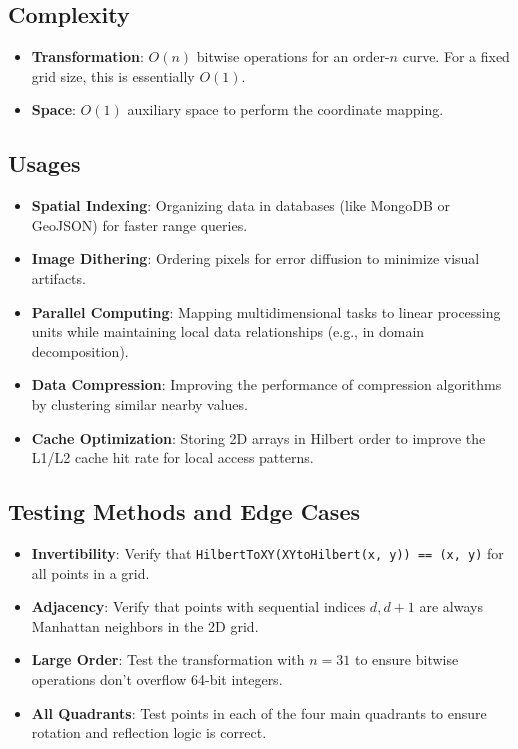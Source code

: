 \subsection{Complexity}
\begin{itemize}
    \item \textbf{Transformation}: $O(n)$ bitwise operations for an order-$n$ curve. For a fixed grid size, this is essentially $O(1)$.
    \item \textbf{Space}: $O(1)$ auxiliary space to perform the coordinate mapping.
\end{itemize}

\subsection{Usages}
\begin{itemize}
    \item \textbf{Spatial Indexing}: Organizing data in databases (like MongoDB or GeoJSON) for faster range queries.
    \item \textbf{Image Dithering}: Ordering pixels for error diffusion to minimize visual artifacts.
    \item \textbf{Parallel Computing}: Mapping multidimensional tasks to linear processing units while maintaining local data relationships (e.g., in domain decomposition).
    \item \textbf{Data Compression}: Improving the performance of compression algorithms by clustering similar nearby values.
    \item \textbf{Cache Optimization}: Storing 2D arrays in Hilbert order to improve the L1/L2 cache hit rate for local access patterns.
\end{itemize}

\subsection{Testing Methods and Edge Cases}
\begin{itemize}
    \item \textbf{Invertibility}: Verify that \texttt{HilbertToXY(XYtoHilbert(x, y)) == (x, y)} for all points in a grid.
    \item \textbf{Adjacency}: Verify that points with sequential indices $d, d+1$ are always Manhattan neighbors in the 2D grid.
    \item \textbf{Large Order}: Test the transformation with $n=31$ to ensure bitwise operations don't overflow 64-bit integers.
    \item \textbf{All Quadrants}: Test points in each of the four main quadrants to ensure rotation and reflection logic is correct.
\end{itemize}

